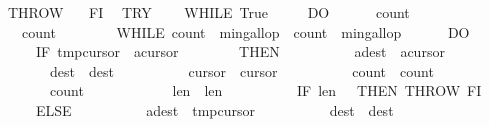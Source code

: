 \begin{isabellebody}
\ \ \ \ THROW\ \isanewline
\ \ FI{\isacharsemicolon}{\isacharsemicolon}\isanewline
\ \ TRY\isanewline
\ \ \ \ WHILE\ True\ \isanewline
\ \ \ \ DO\isanewline
\ \ \ \ \ \ {\isasymacute}count{}\ {\isacharcolon}{\isacharequal}{\isacharequal}\ {}{\isacharsemicolon}{\isacharsemicolon}\isanewline
\ \ \ \ \ \ {\isasymacute}count{}\ {\isacharcolon}{\isacharequal}{\isacharequal}\ {}{\isacharsemicolon}{\isacharsemicolon}\isanewline
\ \ \ \ \ \ WHILE\ {\isacharparenleft}{\isasymacute}count{}\ {\isacharless}\ {\isasymacute}min{\isacharunderscore}gallop\ {\isacharampersand}\ {\isasymacute}count{}\ {\isacharless}\ {\isasymacute}min{\isacharunderscore}gallop{\isacharparenright}\isanewline
\ \ \ \ \ \ DO\isanewline
\ \ \ \ \ \ \ \ IF\ {\isasymacute}tmp{\isacharbang}{\isasymacute}cursor{}\ {\isacharless}\ {\isasymacute}a{\isacharbang}{\isasymacute}cursor{}\isanewline
\ \ \ \ \ \ \ \ THEN\isanewline
\ \ \ \ \ \ \ \ \ \ {\isasymacute}a{\isacharbang}{\isasymacute}dest\ {\isacharcolon}{\isacharequal}{\isacharequal}\ {\isasymacute}a{\isacharbang}{\isasymacute}cursor{}{\isacharsemicolon}{\isacharsemicolon}\isanewline
\ \ \ \ \ \ \ \ \ \ {\isasymacute}dest\ {\isacharcolon}{\isacharequal}{\isacharequal}\ {\isasymacute}dest{\isacharminus}{}{\isacharsemicolon}{\isacharsemicolon}\isanewline
\ \ \ \ \ \ \ \ \ \ {\isasymacute}cursor{}\ {\isacharcolon}{\isacharequal}{\isacharequal}\ {\isasymacute}cursor{}{\isacharminus}{}{\isacharsemicolon}{\isacharsemicolon}\isanewline
\ \ \ \ \ \ \ \ \ \ {\isasymacute}count{}\ {\isacharcolon}{\isacharequal}{\isacharequal}\ {\isasymacute}count{}{\isacharplus}{}{\isacharsemicolon}{\isacharsemicolon}\isanewline
\ \ \ \ \ \ \ \ \ \ {\isasymacute}count{}\ {\isacharcolon}{\isacharequal}{\isacharequal}\ {}{\isacharsemicolon}{\isacharsemicolon}\isanewline
\ \ \ \ \ \ \ \ \ \ {\isasymacute}len{}\ {\isacharcolon}{\isacharequal}{\isacharequal}\ {\isasymacute}len{}{\isacharminus}{}{\isacharsemicolon}{\isacharsemicolon}\isanewline
\ \ \ \ \ \ \ \ \ \ IF\ {\isasymacute}len{}\ {\isacharequal}\ {}\ THEN\ THROW\ FI\isanewline
\ \ \ \ \ \ \ \ ELSE\isanewline
\ \ \ \ \ \ \ \ \ \ {\isasymacute}a{\isacharbang}{\isasymacute}dest\ {\isacharcolon}{\isacharequal}{\isacharequal}\ {\isasymacute}tmp{\isacharbang}{\isasymacute}cursor{}{\isacharsemicolon}{\isacharsemicolon}\isanewline
\ \ \ \ \ \ \ \ \ \ {\isasymacute}dest\ {\isacharcolon}{\isacharequal}{\isacharequal}\ {\isasymacute}dest{\isacharminus}{}{\isacharsemicolon}{\isacharsemicolon}\isanewline

\end{isabellebody}
